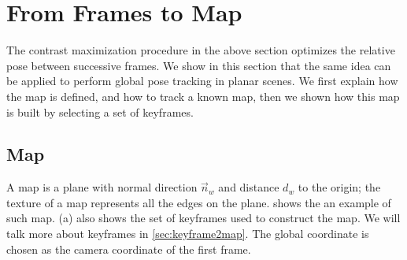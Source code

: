 \section{From Frames to Map}
\label{sec:frame2map}
The contrast maximization procedure in the above section optimizes the
relative pose between successive frames. We show in this section that
the same idea can be applied to perform global pose tracking in planar
scenes. We first explain how the map is defined, and how to track a
known map, then we shown how this map is built by selecting a set of
keyframes.

\subsection{Map}
\label{sec:map}
A map is a plane with normal direction $\vec{n}_w$ and distance $d_w$
to the origin; the texture of a map represents all the edges on the
plane.  shows the an example of such
map. (a) also shows the set of keyframes used to
construct the map. We will talk more about keyframes in
\cref{sec:keyframe2map}. The global coordinate is chosen as the camera
coordinate of the first frame.

